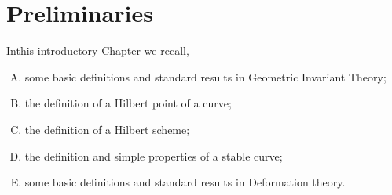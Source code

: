 \setcounter{chapter}{-1}
\chapter{Preliminaries}\label{chap0}%

In\pageoriginale this introductory Chapter we recall,
\begin{enumerate}[A)]
\item some basic definitions and standard results in Geometric
  Invariant Theory; 

\item the definition of a Hilbert point of a curve; 

\item the definition of a Hilbert scheme;

\item the definition and simple properties of a stable curve;

\item some basic definitions and standard results in Deformation
  theory. 
\end{enumerate}

